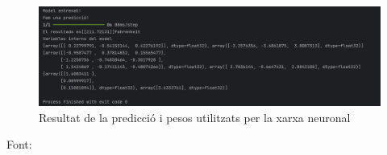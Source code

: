 \begin{figure}[H]
\centering
\includegraphics[width=1\textwidth]{./figures/13.png}
\caption{Resultat de la predicció i pesos utilitzats per la xarxa neuronal}
\end{figure}

Font: \cite{Xarxa_Neuronal}
